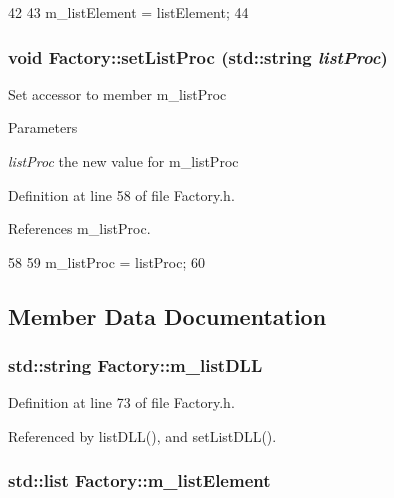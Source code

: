 \begin{DoxyCode}
42                                             {
43     m_listElement = listElement;
44   }
\end{DoxyCode}
\hypertarget{classFactory_afdec7fe6e79da3e5748d33f740333671}{
\subsubsection[{setListProc}]{\setlength{\rightskip}{0pt plus 5cm}void Factory::setListProc (std::string {\em listProc})}}
\label{classFactory_afdec7fe6e79da3e5748d33f740333671}
Set accessor to member m\_\-listProc 
\begin{DoxyParams}{Parameters}
\item[{\em listProc}]the new value for m\_\-listProc \end{DoxyParams}


Definition at line 58 of file Factory.h.

References m\_\-listProc.


\begin{DoxyCode}
58                                         {
59     m_listProc = listProc;
60   }
\end{DoxyCode}


\subsection{Member Data Documentation}
\hypertarget{classFactory_a266167ae49fcf4fa9baa5485dea4b062}{
\subsubsection[{m\_\-listDLL}]{\setlength{\rightskip}{0pt plus 5cm}std::string {\bf Factory::m\_\-listDLL}}}
\label{classFactory_a266167ae49fcf4fa9baa5485dea4b062}


Definition at line 73 of file Factory.h.

Referenced by listDLL(), and setListDLL().\hypertarget{classFactory_a83a99d80105fab2371ce03230b90e8a3}{
\subsubsection[{m\_\-listElement}]{\setlength{\rightskip}{0pt plus 5cm}std::list {\bf Factory::m\_\-listElement}}}
\label{classFactory_a83a99d80105fab2371ce03230b90e8a3}


